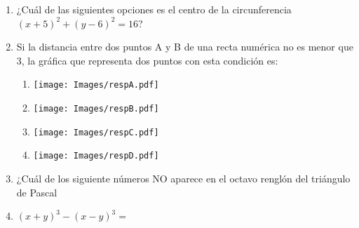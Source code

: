 \documentclass[fleqn]{article}
\begin{document}
\begin{enumerate}
 \begin{enumerate}
 \end{enumerate}
 \item ¿Cuál de las siguientes opciones es el centro de la circunferencia $(x+5)^{2}+(y-6)^{2}=16$?
 \begin{enumerate}
 \end{enumerate}
 \item Si la distancia entre dos puntos A y B de una recta numérica no es menor que 3, la gráfica que representa dos puntos con esta condición es:

\begin{enumerate}
\item \texttt{[image: Images/respA.pdf]} 
\item \texttt{[image: Images/respB.pdf]} 
\item \texttt{[image: Images/respC.pdf]} 
\item \texttt{[image: Images/respD.pdf]} 
\end{enumerate}
 \item ¿Cuál de los siguiente números NO aparece en el octavo renglón del triángulo de Pascal
 \begin{enumerate}
 \end{enumerate}
 \item $(x+y)^{3}-(x-y)^{3}=$
 \begin{enumerate}
 \end{enumerate}
 \end{enumerate}
\end{document}
